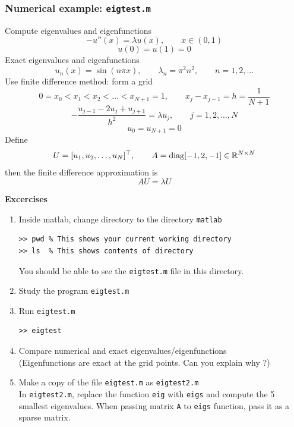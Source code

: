\documentclass[11pt,xcolor=svgnames,onlymath]{beamer}
\begin{document}
\begin{frame}
\frametitle{Numerical example: {\tt eigtest.m}}
Compute eigenvalues and eigenfunctions
\[
-u''(x) = \lambda u(x), \qquad x \in (0,1)
\]
\[
u(0) = u(1) = 0
\]
Exact eigenvalues and eigenfunctions
\[
u_n(x) = \sin(n\pi x), \qquad \lambda_n = \pi^2 n^2, \qquad n=1,2,\ldots
\]
Use finite difference method: form a grid
\[
0 = x_0 < x_1 < x_2 < \ldots < x_{N+1} = 1, \qquad x_j - x_{j-1} = h = \frac{1}{N+1}
\]
\[
- \frac{u_{j-1} - 2 u_j + u_{j+1}}{h^2} = \lambda u_j, \qquad j=1,2,\ldots,N
\]
\[
u_0 = u_{N+1} = 0
\]
Define
\[
U = [u_1, u_2, \ldots, u_N]^\top, \qquad A = \mbox{diag}[-1, 2, -1] \in \mathbb{R}^{N \times N}
\]
then the finite difference approximation is
\[
AU = \lambda U
\]

{\bf Excercises}

\begin{enumerate}

\item Inside matlab, change directory to the directory {\tt matlab}
\begin{lstlisting}
>> pwd % This shows your current working directory
>> ls  % This shows contents of directory
\end{lstlisting}
You should be able to see the {\tt eigtest.m} file in this directory.

\item Study the program {\tt eigtest.m}

\item Run {\tt eigtest.m}
\begin{lstlisting}
>> eigtest
\end{lstlisting}

\item Compare numerical and exact eigenvalues/eigenfunctions\\
(Eigenfunctions are exact at the grid points. Can you explain why ?)

\item Make a copy of the file {\tt eigtest.m} as {\tt eigtest2.m} \\
In {\tt eigtest2.m}, replace the function {\tt eig} with {\tt eigs} and compute the 5 smallest eigenvalues. When passing matrix {\tt A} to {\tt eigs} function, pass it as a sparse matrix.

\end{enumerate}

\end{frame}
\end{document}
